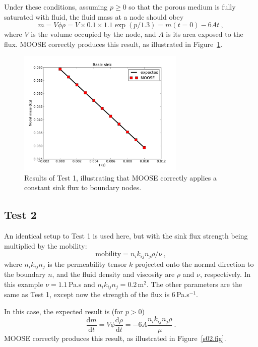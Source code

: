 \documentclass[]{scrreprt}
\def\d{\mathrm{d}}
\begin{document}
Under these conditions, assuming $p\geq 0$ so that the porous medium
is fully saturated with fluid, the fluid mass at a node should obey
\begin{equation}
m = V\phi\rho = V\times0.1\times 1.1\exp(p/1.3) = m(t=0) - 6At \ ,
\end{equation}
where $V$ is the volume occupied by the node, and $A$ is its area
exposed to the flux.  MOOSE correctly produces this result, as
illustrated in Figure~\ref{s01.fig}.

\begin{figure}[htb]
\begin{center}
\includegraphics[width=8cm]{s01.pdf}
\caption{Results of Test 1, illustrating that MOOSE correctly applies
  a constant sink flux to boundary nodes.}
\label{s01.fig}
\end{center}
\end{figure}

\subsection{Test 2}

An identical setup to Test 1 is used here, but with the sink flux
strength being multiplied by the mobility:
\begin{equation}
\mbox{mobility} = n_{i}k_{ij}n_{j}\rho/\nu \ ,
\end{equation}
where $n_{i}k_{ij}n_{j}$ is the permeability tensor $k$ projected onto
the normal direction to the boundary $n$, and the fluid density and
viscosity are $\rho$ and $\nu$, respectively.  In this example
$\nu=1.1$\,Pa.s and $n_{i}k_{ij}n_{j}=0.2$\,m$^{2}$.  The other
parameters are the same as Test 1, except now the strength of the flux
is 6\,Pa.s$^{-1}$.

In this case, the expected result is (for $p>0$)
\begin{equation}
\frac{\d m}{\d t} = V\phi \frac{\d \rho}{\d t} = -6 A
\frac{n_{i}k_{ij}n_{j}\rho}{\mu} \ .
\end{equation}
MOOSE correctly produces this result, as illustrated in
Figure~\ref{s02.fig}. 
\end{document}
